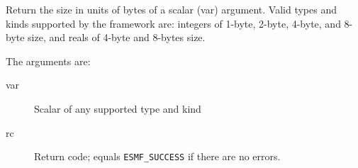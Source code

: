  
   Return the size in units of bytes of a scalar (var) argument. 
   Valid types and kinds supported by the framework are: 
   integers of 1-byte, 2-byte, 4-byte, and 8-byte size, and 
   reals of 4-byte and 8-bytes size. 
   
   The arguments are: 
   \begin{description} 
   \item [var] 
   Scalar of any supported type and kind 
   \item [rc] 
   Return code; equals {\tt ESMF\_SUCCESS} if there are no errors. 
   \end{description} 
   
\setlength{\parskip}{\oldparskip}
\setlength{\parindent}{\oldparindent}
\setlength{\baselineskip}{\oldbaselineskip}
